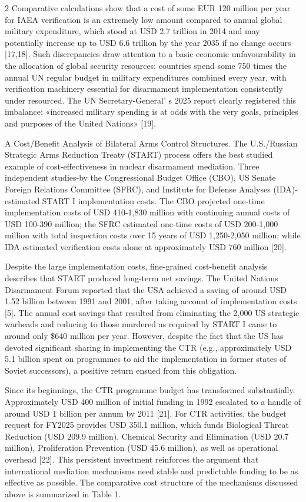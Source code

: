 \begin{multicols}{2}
Comparative calculations show that a cost of some EUR 120 million per
year for IAEA verification is an extremely low amount compared to annual
global military expenditure, which stood at USD 2.7 trillion in 2014 and
may potentially increase up to USD 6.6 trillion by the year 2035 if no
change occurs {[}17,18{]}. Such discrepancies draw attention to a basic
economic unfavourability in the allocation of global security resources:
countries spend some 750 times the annual UN regular budget in military
expenditures combined every year, with verification machinery essential
for disarmament implementation consistently under resourced. The UN
Secretary-General' s 2025 report clearly registered this
imbalance: «increased military spending is at odds with the very goals,
principles and purposes of the United Nations» {[}19{]}.

A Cost/Benefit Analysis of Bilateral Arms Control Structures. The
U.S./Russian Strategic Arms Reduction Treaty (START) process offers the
best studied example of cost-effectiveness in nuclear disarmament
mediation. Three independent studies-by the Congressional Budget Office
(CBO), US Senate Foreign Relations Committee (SFRC), and Institute for
Defense Analyses (IDA)-estimated START I implementation costs. The CBO
projected one-time implementation costs of USD 410-1,830 million with
continuing annual costs of USD 100-390 million; the SFRC estimated
one-time costs of USD 200-1,000 million with total inspection costs over
15 years of USD 1,250-2,050 million; while IDA estimated verification
costs alone at approximately USD 760 million {[}20{]}.

Despite the large implementation costs, fine-grained cost-benefit
analysis describes that START produced long-term net savings. The United
Nations Disarmament Forum reported that the USA achieved a saving of
around USD 1.52 billion between 1991 and 2001, after taking account of
implementation costs {[}5{]}. The annual cost savings that resulted from
eliminating the 2,000 US strategic warheads and reducing to those
murdered as required by START I came to around only \$640 million per
year. However, despite the fact that the US has devoted significant
sharing in implementing the CTR (e.g., approximately USD 5.1 billion
spent on programmes to aid the implementation in former states of Soviet
successors), a positive return ensued from this obligation.

Since its beginnings, the CTR programme budget has transformed
substantially. Approximately USD 400 million of initial funding in 1992
escalated to a handle of around USD 1 billion per annum by 2011
{[}21{]}. For CTR activities, the budget request for FY2025 provides USD
350.1 million, which funds Biological Threat Reduction (USD 209.9
million), Chemical Security and Elimination (USD 20.7 million),
Proliferation Prevention (USD 45.6 million), as well as operational
overhead {[}22{]}. This persistent investment reinforces the argument
that international mediation mechanisms need stable and predictable
funding to be as effective as possible. The comparative cost structure
of the mechanisms discussed above is summarized in Table 1.
\end{multicols}

